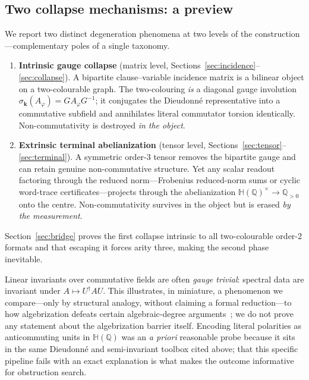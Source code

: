 \documentclass[pdflatex,sn-mathphys-num]{sn-jnl}
\theoremstyle{thmstyleone}%
\theoremstyle{thmstyletwo}%
\theoremstyle{thmstylethree}%
\newcommand{\HH}{\mathbb{H}}
\newcommand{\QQ}{\mathbb{Q}}
\newcommand{\bk}{\mathbf{k}}
\newcommand{\Aphi}{A_{\varphi}}
\begin{document}
\subsection{Two collapse mechanisms: a preview}

We report two distinct degeneration phenomena at two levels of the
construction---complementary poles of a single taxonomy.

\begin{enumerate}
\item \textbf{Intrinsic gauge collapse} (matrix level,
Sections~\ref{sec:incidence}--\ref{sec:collapse}). A bipartite
clause--variable incidence matrix is a bilinear object on a two-colourable
graph. The two-colouring \emph{is} a diagonal gauge involution
$\sigma_{\bk}(\Aphi)=G\Aphi G^{-1}$; it conjugates the Dieudonn\'e
representative into a commutative subfield and annihilates literal commutator
torsion identically. Non-commutativity is destroyed \emph{in the object}.

\item \textbf{Extrinsic terminal abelianization} (tensor level,
Sections~\ref{sec:tensor}--\ref{sec:terminal}). A symmetric order-$3$ tensor
removes the bipartite gauge and can retain genuine non-commutative structure.
Yet any scalar readout factoring through the reduced norm---Frobenius
reduced-norm sums or cyclic word-trace certificates---projects through the
abelianization $\HH(\QQ)^{\times}\to\QQ_{>0}$ onto the centre. Non-commutativity
survives in the object but is erased \emph{by the measurement}.
\end{enumerate}

Section~\ref{sec:bridge} proves the first collapse intrinsic to all
two-colourable order-$2$ formats and that escaping it forces arity three,
making the second phase inevitable.

Linear invariants over commutative fields are often \emph{gauge trivial}:
spectral data are invariant under $A\mapsto U^{\dagger}AU$. This illustrates,
in miniature, a phenomenon we compare---only by structural analogy, without
claiming a formal reduction---to how algebrization defeats certain
algebraic-degree arguments~\cite{AW}; we do not prove any statement about
the algebrization barrier itself. Encoding literal polarities as
anticommuting units in $\HH(\QQ)$ was an \emph{a priori} reasonable probe
because it sits in the same Dieudonn\'e and semi-invariant toolbox cited
above; that this specific pipeline fails with an exact explanation is what
makes the outcome informative for obstruction search.
\end{document}
